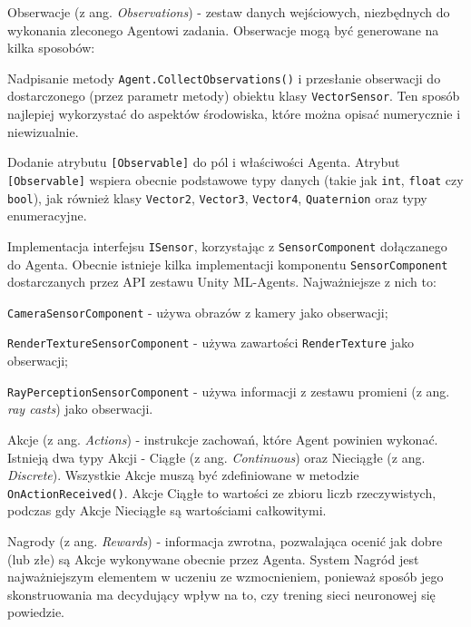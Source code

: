 \begin{enumerate*}
\item Obserwacje (z ang. \textit{Observations}) - zestaw danych wejściowych, niezbędnych do wykonania zleconego Agentowi zadania. Obserwacje mogą być generowane na kilka sposobów:
\begin{itemize*}
\item Nadpisanie metody \texttt{Agent.CollectObservations()} i przesłanie obserwacji do dostarczonego (przez parametr metody) obiektu klasy \texttt{VectorSensor}. Ten sposób najlepiej wykorzystać do aspektów środowiska, które można opisać numerycznie i niewizualnie.
\item Dodanie atrybutu \texttt{[Observable]} do pól i właściwości Agenta. Atrybut \\ \texttt{[Observable]} wspiera obecnie podstawowe typy danych (takie jak  \texttt{int}, \texttt{float} czy \texttt{bool}), jak również klasy \texttt{Vector2}, \texttt{Vector3}, \texttt{Vector4}, \texttt{Quaternion} oraz typy enumeracyjne.
\item Implementacja interfejsu \texttt{ISensor}, korzystając z \texttt{SensorComponent} dołączanego do Agenta. Obecnie istnieje kilka implementacji komponentu \texttt{SensorComponent} dostarczanych przez API zestawu Unity ML-Agents. Najważniejsze z nich to:
\begin{itemize*}
\item \texttt{CameraSensorComponent} - używa obrazów z kamery jako obserwacji;
\item \texttt{RenderTextureSensorComponent} - używa zawartości \texttt{RenderTexture} \cite{unity:renderTexture} jako obserwacji;
\item \texttt{RayPerceptionSensorComponent} - używa informacji z zestawu promieni (z ang. \textit{ray casts}) jako obserwacji.
\end{itemize*}
\end{itemize*}
\item Akcje (z ang. \textit{Actions}) - instrukcje zachowań, które Agent powinien wykonać. Istnieją dwa typy Akcji - Ciągłe (z ang. \textit{Continuous}) oraz Nieciągłe (z ang. \textit{Discrete}). Wszystkie Akcje muszą być zdefiniowane w metodzie \texttt{OnActionReceived()}. Akcje Ciągłe to wartości ze zbioru liczb rzeczywistych, podczas gdy Akcje Nieciągłe są wartościami całkowitymi.
\item Nagrody (z ang. \textit{Rewards}) - informacja zwrotna, pozwalająca ocenić jak dobre (lub złe) są Akcje wykonywane obecnie przez Agenta. System Nagród jest najważniejszym elementem w uczeniu ze wzmocnieniem, ponieważ sposób jego skonstruowania ma decydujący wpływ na to, czy trening sieci neuronowej się powiedzie.
\end{enumerate*}

